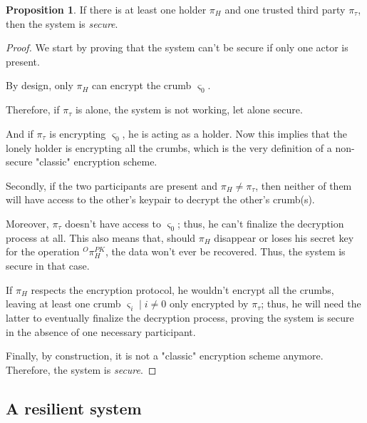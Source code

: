 \documentclass[twoside,twocolumn]{article}
\theoremstyle{definition}
\newtheorem{proposition}{Proposition}
\theoremstyle{remark}
\begin{document}
\begin{proposition}
    \label{prop:min1}
    If there is at least one holder $\pi_H$ and one trusted third party $\pi_\tau$, then the system is \emph{secure}.
\end{proposition}

\begin{proof}
    We start by proving that the system can't be secure if only one actor is present.

    \vspace{1em} %

    By design, only $\pi_H$ can encrypt the crumb $\varsigma_0$.
    
    Therefore, if $\pi_\tau$ is alone, the system is not working, let alone secure.
    
    And if $\pi_\tau$ is encrypting $\varsigma_0$, he is acting as a holder.
    Now this implies that the lonely holder is encrypting all the crumbs, which is the very definition of a non-secure "classic" encryption scheme.

    \vspace{1em} %

    Secondly, if the two participants are present and $\pi_H \neq \pi_\tau$, then neither of them will have access to the other's keypair to decrypt the 
    other's crumb(s). 
    
    Moreover, $\pi_\tau$ doesn't have access to $\varsigma_0$; thus, he can't finalize the decryption process at all.
    This also means that, should $\pi_H$ disappear or loses his secret key for the operation ${}^O\pi_H^{PK}$, the data won't ever be recovered. Thus,
    the system is secure in that case.

    \vspace{1em} %

    If $\pi_H$ respects the encryption protocol, he wouldn't encrypt all the crumbs, leaving at least one crumb $\varsigma_i \mid i \neq 0$ only 
    encrypted by $\pi_\tau$; thus, he will need the latter to eventually finalize the decryption process, proving the system is secure in the absence of 
    one necessary participant.
    
    Finally, by construction, it is not a "classic" encryption scheme anymore. Therefore, the system is \emph{secure}.
\end{proof}

\subsection{A resilient system}
\end{document}
